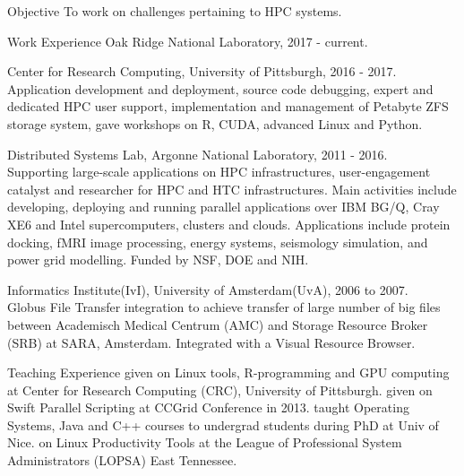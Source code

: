 \documentclass{resume}
\author{Ketan C Maheshwari}
\begin{document}
% 
\maketitle


\begin{category}{Objective}
\citemnobullet To work on challenges pertaining to HPC systems.
\end{category}


\begin{category}{Work Experience}
 Oak Ridge National Laboratory, 2017 - current.

 Center for Research Computing, University of Pittsburgh, 2016 - 2017.
Application development and deployment, source code debugging, expert and dedicated HPC user support,
implementation and management of Petabyte ZFS storage system, gave workshops on R, CUDA, advanced Linux and Python.

 Distributed Systems Lab, Argonne National
Laboratory, 2011 - 2016.\\
Supporting large-scale applications on HPC infrastructures, user-engagement
catalyst and researcher for HPC and HTC infrastructures. Main activities
include developing, deploying and running parallel applications over IBM BG/Q,
Cray XE6 and Intel supercomputers, clusters and clouds. Applications
include protein docking, fMRI image processing, energy systems,
seismology simulation, and power grid modelling. Funded by NSF, DOE and
NIH.

 Informatics Institute(IvI), University of
Amsterdam(UvA), 2006 to 2007.\\
Globus File Transfer integration to
achieve transfer of large number of big files between Academisch Medical
Centrum (AMC) and Storage Resource Broker (SRB) at SARA, Amsterdam. Integrated
with a Visual Resource Browser.

\end{category}

\begin{category}{Teaching Experience}
 given on Linux tools, R-programming and GPU computing at Center for Research Computing (CRC), University of Pittsburgh.
 given on Swift Parallel Scripting at CCGrid Conference in 2013.
 taught Operating Systems, Java and C++ courses to undergrad students during PhD at Univ of Nice. 
 on Linux Productivity Tools at the League of Professional System Administrators (LOPSA) East Tennessee.
\end{category}
\end{document}
